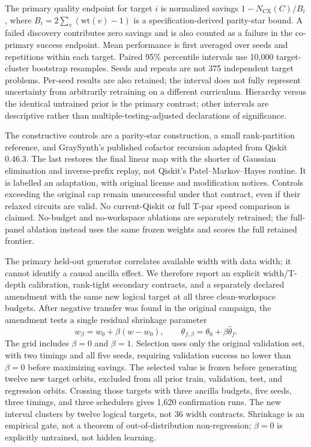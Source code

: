 \documentclass[11pt]{article}
\theoremstyle{definition}\newtheorem{definition}[theorem]{Definition}
\newcommand{\CN}{N_{\mathrm{CX}}}
\begin{document}
The primary quality endpoint for target $i$ is normalized savings $1-\CN(C)/B_i$, where $B_i=2\sum_v(\mathrm{wt}(v)-1)$ is a specification-derived parity-star bound. A failed discovery contributes zero savings and is also counted as a failure in the co-primary success endpoint. Mean performance is first averaged over seeds and repetitions within each target. Paired 95\% percentile intervals use 10,000 target-cluster bootstrap resamples. Seeds and repeats are not 375 independent target problems. Per-seed results are also retained; the interval does not fully represent uncertainty from arbitrarily retraining on a different curriculum. Hierarchy versus the identical untrained prior is the primary contrast; other intervals are descriptive rather than multiple-testing-adjusted declarations of significance.

The constructive controls are a parity-star construction, a small rank-partition reference, and GraySynth's published cofactor recursion adapted from Qiskit 0.46.3. The last restores the final linear map with the shorter of Gaussian elimination and inverse-prefix replay, not Qiskit's Patel--Markov--Hayes routine. It is labelled an adaptation, with original license and modification notices. Controls exceeding the original cap remain unsuccessful under that contract, even if their relaxed circuits are valid. No current-Qiskit or full T-par speed comparison is claimed. No-budget and no-workspace ablations are separately retrained; the full-panel ablation instead uses the same frozen weights and scores the full retained frontier.

The primary held-out generator correlates available width with data width; it cannot identify a causal ancilla effect. We therefore report an explicit width/T-depth calibration, rank-tight secondary contracts, and a separately declared amendment with the same new logical target at all three clean-workspace budgets. After negative transfer was found in the original campaign, the amendment tests a single residual shrinkage parameter
\begin{equation}
w_\beta=w_0+\beta(w-w_0),\qquad
\theta_{f,\beta}=\theta_0+\beta\hat\theta_f.
\end{equation}
The grid includes $\beta=0$ and $\beta=1$. Selection uses only the original validation set, with two timings and all five seeds, requiring validation success no lower than $\beta=0$ before maximizing savings. The selected value is frozen before generating twelve new target orbits, excluded from all prior train, validation, test, and regression orbits. Crossing those targets with three ancilla budgets, five seeds, three timings, and three schedulers gives 1,620 confirmation runs. The new interval clusters by twelve logical targets, not 36 width contracts. Shrinkage is an empirical gate, not a theorem of out-of-distribution non-regression; $\beta=0$ is explicitly untrained, not hidden learning.
\end{document}
